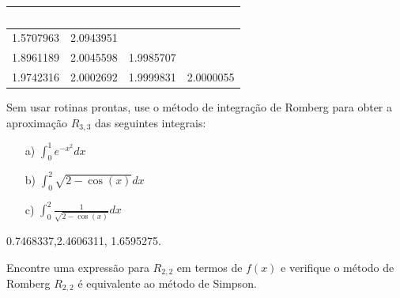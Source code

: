\begin{Answer}
  \begin{tiny}
\begin{center}
\begin{tabular}{|c|c|c|c|}
\hline
~\hspace{40pt}~& ~\hspace{40pt}~& ~\hspace{40pt}~&\\
\hline
1.5707963  &  2.0943951 &&\\
\hline
1.8961189  &  2.0045598 &   1.9985707  &   \\
\hline
1.9742316  &  2.0002692 &   1.9999831 &   2.0000055  \\
\hline
\end{tabular}
\end{center}    
  \end{tiny}
\end{Answer}


\begin{Exercise} Sem usar rotinas prontas, use o método de integração de Romberg para obter a aproximação $R_{3,3}$ das seguintes integrais:
\begin{itemize}
\item[a)] $\int_{0}^1 e^{-x^2}dx$
\item[b)] $\int_{0}^2 \sqrt{2-\cos(x)}dx$
\item[c)] $\int_{0}^2 \frac{1}{\sqrt{2-\cos(x)}}dx$
\end{itemize}
\end{Exercise}
\begin{Answer}
  \begin{tiny}
0.7468337,2.4606311, 1.6595275.    
  \end{tiny}
\end{Answer}
\begin{Exercise} Encontre uma expressão para $R_{2,2}$ em termos de $f(x)$ e verifique o método de Romberg $R_{2,2}$ é equivalente ao método de Simpson.
\end{Exercise}

